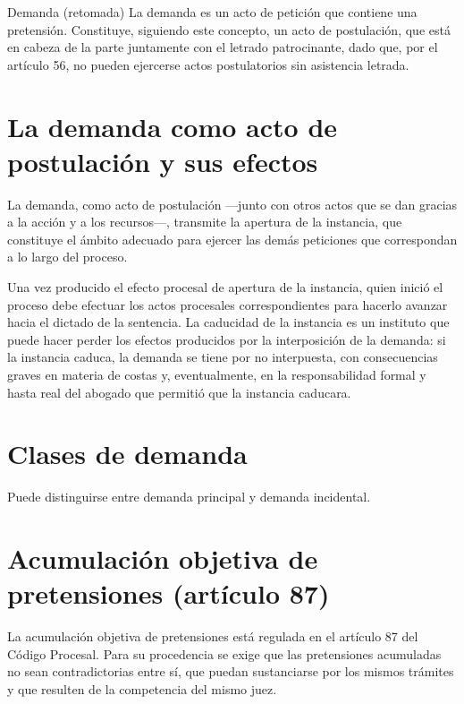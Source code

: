 \documentclass[12pt,oneside]{book}
\begin{document}
\begin{definition}{Demanda (retomada)}
La demanda es un acto de petición que contiene una pretensión. Constituye, siguiendo este concepto, un acto de postulación, que está en cabeza de la parte juntamente con el letrado patrocinante, dado que, por el artículo 56, no pueden ejercerse actos postulatorios sin asistencia letrada.
\end{definition}

\section{La demanda como acto de postulación y sus efectos}

La demanda, como acto de postulación —junto con otros actos que se dan gracias a la acción y a los recursos—, transmite la apertura de la instancia, que constituye el ámbito adecuado para ejercer las demás peticiones que correspondan a lo largo del proceso.

\begin{important}
Una vez producido el efecto procesal de apertura de la instancia, quien inició el proceso debe efectuar los actos procesales correspondientes para hacerlo avanzar hacia el dictado de la sentencia. La caducidad de la instancia es un instituto que puede hacer perder los efectos producidos por la interposición de la demanda: si la instancia caduca, la demanda se tiene por no interpuesta, con consecuencias graves en materia de costas y, eventualmente, en la responsabilidad formal y hasta real del abogado que permitió que la instancia caducara.
\end{important}

\section{Clases de demanda}

Puede distinguirse entre demanda principal y demanda incidental.


\section{Acumulación objetiva de pretensiones (artículo 87)}

La acumulación objetiva de pretensiones está regulada en el artículo 87 del Código Procesal. Para su procedencia se exige que las pretensiones acumuladas no sean contradictorias entre sí, que puedan sustanciarse por los mismos trámites y que resulten de la competencia del mismo juez.
\end{document}
